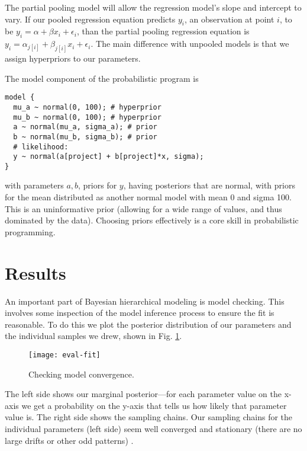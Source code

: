 \documentclass[sigconf,natbib=false]{acmart}
\begin{document}
The partial pooling model will allow the regression model's slope and intercept to vary. If our pooled regression equation predicts $y_i$, an observation at point $i$, to be  $y_i = \alpha + \beta x_i + \epsilon_i$, than the partial pooling regression equation is $y_i = \alpha_{j[i]} + \beta_{j[i]} x_{i} + \epsilon_i$. The main difference with unpooled models is that we assign hyperpriors to our parameters. 

The model component of the probabilistic program is 
\begin{verbatim}
model {
  mu_a ~ normal(0, 100); # hyperprior
  mu_b ~ normal(0, 100); # hyperprior
  a ~ normal(mu_a, sigma_a); # prior
  b ~ normal(mu_b, sigma_b); # prior
  # likelihood:
  y ~ normal(a[project] + b[project]*x, sigma); 
}
\end{verbatim}

with parameters $a,b$, priors for $y$, having posteriors that are normal, with priors for the mean distributed as another normal model with mean 0 and sigma 100. This is an uninformative prior (allowing for a wide range of values, and thus dominated by the data). Choosing priors effectively is a core skill in probabilistic programming. 

\section{Results} 
An important part of Bayesian hierarchical modeling is model checking. This involves some inspection of the model inference process to ensure the fit is reasonable. To do this we plot the posterior distribution of our parameters and the individual samples we drew, shown in Fig. \ref{fig:modelcheck}.

\begin{figure}[tb]
	\centering
	\texttt{[image: eval-fit]}
	\caption{Checking model convergence.}
	\label{fig:modelcheck}
\end{figure}

The left side shows our marginal posterior---for each parameter value on the x-axis we get a probability on the y-axis that tells us how likely that parameter value is. The right side shows the sampling chains. Our sampling chains for the individual parameters (left side) seem well converged and stationary (there are no large drifts or other odd patterns) \cite{Sorensen16}.

\end{document}
